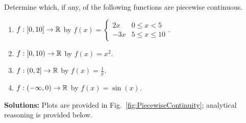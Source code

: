 \bigskip


\begin{example}
\label{ex:WhichArePiecewiseContinuous}
    Determine which, if any, of the following functions are piecewise continuous. 

\begin{enumerate}
\renewcommand{\labelenumi}{(\alph{enumi})}
\setlength{\itemsep}{.2cm}
    \item $f:[0, 10] \to \mathbb R$ by $f(x) = \begin{cases}
        2 x & 0 \le x < 5 \\
        -3 x & 5 \le x \le 10
            \end{cases}$.
    \item $f:[0, 10) \to \mathbb R$ by $f(x) = x^2$.
    \item  $f:(0, 2] \to \mathbb R$ by $f(x) = \frac{1}{x}$.
    \item  $f: (-\infty, 0)  \to \mathbb R$ by $f(x) = \sin(x)$.
\end{enumerate}
\end{example}

\textbf{Solutions:} Plots are provided in Fig.~\ref{fig:PiecewiseContinuity}; analytical reasoning is provided below.

